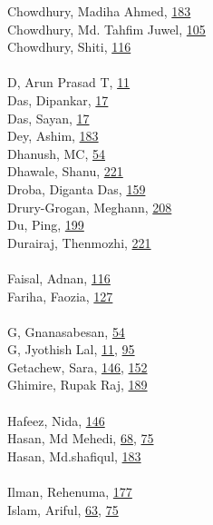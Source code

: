 \documentclass[11pt,oneside]{book}
\begin{document}
\begin{multicols}{2}
Chowdhury, Madiha Ahmed, \hyperlink{page.183}{183}\\
Chowdhury, Md. Tahfim Juwel, \hyperlink{page.105}{105}\\
Chowdhury, Shiti, \hyperlink{page.116}{116}\\
\\ %
D, Arun Prasad T, \hyperlink{page.11}{11}\\
Das, Dipankar, \hyperlink{page.17}{17}\\
Das, Sayan, \hyperlink{page.17}{17}\\
Dey, Ashim, \hyperlink{page.183}{183}\\
Dhanush, MC, \hyperlink{page.54}{54}\\
Dhawale, Shanu, \hyperlink{page.221}{221}\\
Droba, Diganta Das, \hyperlink{page.159}{159}\\
Drury-Grogan, Meghann, \hyperlink{page.208}{208}\\
Du, Ping, \hyperlink{page.199}{199}\\
Durairaj, Thenmozhi, \hyperlink{page.221}{221}\\
\\ %
Faisal, Adnan, \hyperlink{page.116}{116}\\
Fariha, Faozia, \hyperlink{page.127}{127}\\
\\ %
G, Gnanasabesan, \hyperlink{page.54}{54}\\
G, Jyothish Lal, \hyperlink{page.11}{11}, \hyperlink{page.95}{95}\\
Getachew, Sara, \hyperlink{page.146}{146}, \hyperlink{page.152}{152}\\
Ghimire, Rupak Raj, \hyperlink{page.189}{189}\\
\\ %
Hafeez, Nida, \hyperlink{page.146}{146}\\
Hasan, Md Mehedi, \hyperlink{page.68}{68}, \hyperlink{page.75}{75}\\
Hasan, Md.shafiqul, \hyperlink{page.183}{183}\\
\\ %
Ilman, Rehenuma, \hyperlink{page.177}{177}\\
Islam, Ariful, \hyperlink{page.63}{63}, \hyperlink{page.75}{75}\\
\\ %

\end{multicols}
\end{document}
